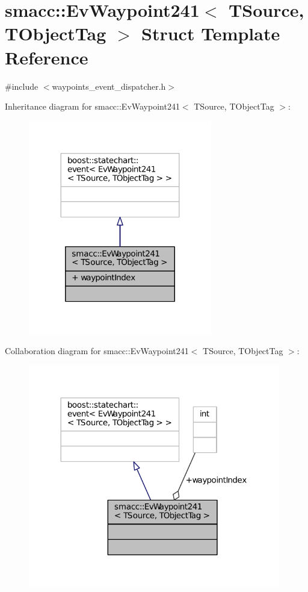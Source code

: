 \hypertarget{structsmacc_1_1EvWaypoint241}{}\section{smacc\+:\+:Ev\+Waypoint241$<$ T\+Source, T\+Object\+Tag $>$ Struct Template Reference}
\label{structsmacc_1_1EvWaypoint241}


{\ttfamily \#include $<$waypoints\+\_\+event\+\_\+dispatcher.\+h$>$}



Inheritance diagram for smacc\+:\+:Ev\+Waypoint241$<$ T\+Source, T\+Object\+Tag $>$\+:
\nopagebreak
\begin{figure}[H]
\begin{center}
\leavevmode
\includegraphics[width=227pt]{structsmacc_1_1EvWaypoint241__inherit__graph}
\end{center}
\end{figure}


Collaboration diagram for smacc\+:\+:Ev\+Waypoint241$<$ T\+Source, T\+Object\+Tag $>$\+:
\nopagebreak
\begin{figure}[H]
\begin{center}
\leavevmode
\includegraphics[width=312pt]{structsmacc_1_1EvWaypoint241__coll__graph}
\end{center}
\end{figure}
